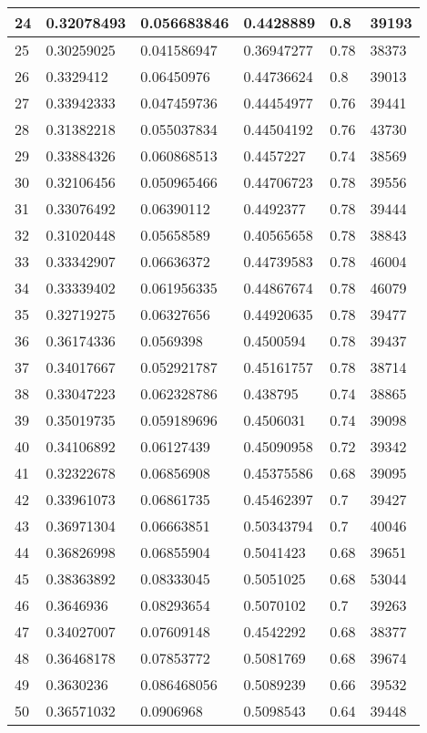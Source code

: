 \begin{longtable}{|l|l|l|l|l|l|}
24 & 0.32078493 & 0.056683846 & 0.4428889 & 0.8 & 39193 \\ \hline 
25 & 0.30259025 & 0.041586947 & 0.36947277 & 0.78 & 38373 \\ \hline 
26 & 0.3329412 & 0.06450976 & 0.44736624 & 0.8 & 39013 \\ \hline 
27 & 0.33942333 & 0.047459736 & 0.44454977 & 0.76 & 39441 \\ \hline 
28 & 0.31382218 & 0.055037834 & 0.44504192 & 0.76 & 43730 \\ \hline 
29 & 0.33884326 & 0.060868513 & 0.4457227 & 0.74 & 38569 \\ \hline 
30 & 0.32106456 & 0.050965466 & 0.44706723 & 0.78 & 39556 \\ \hline 
31 & 0.33076492 & 0.06390112 & 0.4492377 & 0.78 & 39444 \\ \hline 
32 & 0.31020448 & 0.05658589 & 0.40565658 & 0.78 & 38843 \\ \hline 
33 & 0.33342907 & 0.06636372 & 0.44739583 & 0.78 & 46004 \\ \hline 
34 & 0.33339402 & 0.061956335 & 0.44867674 & 0.78 & 46079 \\ \hline 
35 & 0.32719275 & 0.06327656 & 0.44920635 & 0.78 & 39477 \\ \hline 
36 & 0.36174336 & 0.0569398 & 0.4500594 & 0.78 & 39437 \\ \hline 
37 & 0.34017667 & 0.052921787 & 0.45161757 & 0.78 & 38714 \\ \hline 
38 & 0.33047223 & 0.062328786 & 0.438795 & 0.74 & 38865 \\ \hline 
39 & 0.35019735 & 0.059189696 & 0.4506031 & 0.74 & 39098 \\ \hline 
40 & 0.34106892 & 0.06127439 & 0.45090958 & 0.72 & 39342 \\ \hline 
41 & 0.32322678 & 0.06856908 & 0.45375586 & 0.68 & 39095 \\ \hline 
42 & 0.33961073 & 0.06861735 & 0.45462397 & 0.7 & 39427 \\ \hline 
43 & 0.36971304 & 0.06663851 & 0.50343794 & 0.7 & 40046 \\ \hline 
44 & 0.36826998 & 0.06855904 & 0.5041423 & 0.68 & 39651 \\ \hline 
45 & 0.38363892 & 0.08333045 & 0.5051025 & 0.68 & 53044 \\ \hline 
46 & 0.3646936 & 0.08293654 & 0.5070102 & 0.7 & 39263 \\ \hline 
47 & 0.34027007 & 0.07609148 & 0.4542292 & 0.68 & 38377 \\ \hline 
48 & 0.36468178 & 0.07853772 & 0.5081769 & 0.68 & 39674 \\ \hline 
49 & 0.3630236 & 0.086468056 & 0.5089239 & 0.66 & 39532 \\ \hline 
50 & 0.36571032 & 0.0906968 & 0.5098543 & 0.64 & 39448 \\ \hline 
\end{longtable}